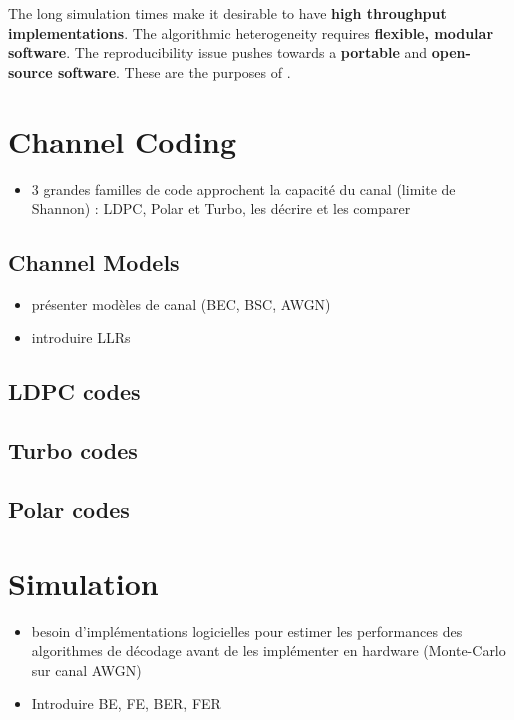 The long simulation times make it desirable to have \textbf{high throughput
implementations}. The algorithmic heterogeneity requires \textbf{flexible,
modular software}. The reproducibility issue pushes towards a \textbf{portable}
and \textbf{open-source software}. These are the purposes of \AFFECT.

\section{Channel Coding}

\begin{itemize}
  \item 3 grandes familles de code approchent la capacité du canal (limite de
    Shannon) : LDPC, Polar et Turbo, les décrire et les comparer
\end{itemize}

\subsection{Channel Models}

\begin{itemize}
  \item présenter modèles de canal (BEC, BSC, AWGN)
  \item introduire LLRs
\end{itemize}

\subsection{LDPC codes}

\subsection{Turbo codes}

\subsection{Polar codes}

\section{Simulation}

\begin{itemize}
  \item besoin d'implémentations logicielles pour estimer les performances des
    algorithmes de décodage avant de les implémenter en hardware (Monte-Carlo
    sur canal AWGN)
  \item Introduire BE, FE, BER, FER
\end{itemize}

